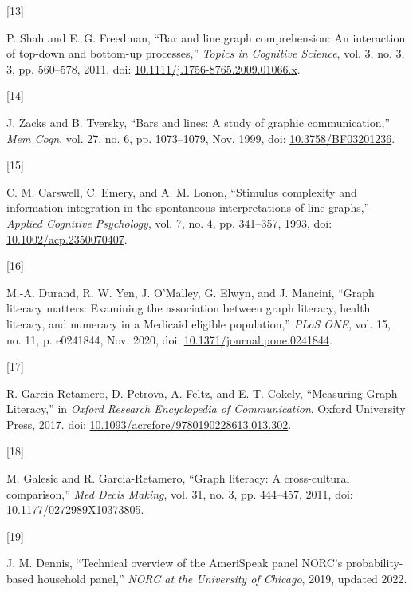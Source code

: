 \documentclass{IEEEcsmag}
\newlength{\cslhangindent}
\newlength{\csllabelwidth}
\newenvironment{CSLReferences}[2] %
 {\begin{list}{}{%
  \setlength{\itemindent}{0pt}
  \setlength{\leftmargin}{0pt}
  \setlength{\parsep}{0pt}
  \ifodd #1
   \setlength{\leftmargin}{\cslhangindent}
   \setlength{\itemindent}{-1\cslhangindent}
  \fi
  \setlength{\itemsep}{#2\baselineskip}}}
 {\end{list}}
\newcommand{\CSLLeftMargin}[1]{\parbox[t]{\csllabelwidth}{#1}}
\newcommand{\CSLRightInline}[1]{\parbox[t]{\linewidth - \csllabelwidth}{#1}\break}
\begin{document}
\begin{CSLReferences}{0}{0}
\CSLLeftMargin{{[}13{]} }%
\CSLRightInline{P. Shah and E. G. Freedman, {``Bar and line graph comprehension: {An} interaction of top-down and bottom-up processes,''} \emph{Topics in Cognitive Science}, vol. 3, no. 3, 3, pp. 560--578, 2011, doi: \href{https://doi.org/10.1111/j.1756-8765.2009.01066.x}{10.1111/j.1756-8765.2009.01066.x}.}

\CSLLeftMargin{{[}14{]} }%
\CSLRightInline{J. Zacks and B. Tversky, {``Bars and lines: {A} study of graphic communication,''} \emph{Mem Cogn}, vol. 27, no. 6, pp. 1073--1079, Nov. 1999, doi: \href{https://doi.org/10.3758/BF03201236}{10.3758/BF03201236}.}

\CSLLeftMargin{{[}15{]} }%
\CSLRightInline{C. M. Carswell, C. Emery, and A. M. Lonon, {``Stimulus complexity and information integration in the spontaneous interpretations of line graphs,''} \emph{Applied Cognitive Psychology}, vol. 7, no. 4, pp. 341--357, 1993, doi: \href{https://doi.org/10.1002/acp.2350070407}{10.1002/acp.2350070407}.}

\CSLLeftMargin{{[}16{]} }%
\CSLRightInline{M.-A. Durand, R. W. Yen, J. O'Malley, G. Elwyn, and J. Mancini, {``Graph literacy matters: {Examining} the association between graph literacy, health literacy, and numeracy in a {Medicaid} eligible population,''} \emph{PLoS ONE}, vol. 15, no. 11, p. e0241844, Nov. 2020, doi: \href{https://doi.org/10.1371/journal.pone.0241844}{10.1371/journal.pone.0241844}.}

\CSLLeftMargin{{[}17{]} }%
\CSLRightInline{R. Garcia-Retamero, D. Petrova, A. Feltz, and E. T. Cokely, {``Measuring {Graph Literacy},''} in \emph{Oxford {Research Encyclopedia} of {Communication}}, Oxford University Press, 2017. doi: \href{https://doi.org/10.1093/acrefore/9780190228613.013.302}{10.1093/acrefore/9780190228613.013.302}.}

\CSLLeftMargin{{[}18{]} }%
\CSLRightInline{M. Galesic and R. Garcia-Retamero, {``Graph literacy: A cross-cultural comparison,''} \emph{Med Decis Making}, vol. 31, no. 3, pp. 444--457, 2011, doi: \href{https://doi.org/10.1177/0272989X10373805}{10.1177/0272989X10373805}.}

\CSLLeftMargin{{[}19{]} }%
\CSLRightInline{J. M. Dennis, {``Technical overview of the {AmeriSpeak} panel {NORC}'s probability-based household panel,''} \emph{NORC at the University of Chicago}, 2019, updated 2022.}


\end{CSLReferences}
\end{document}
